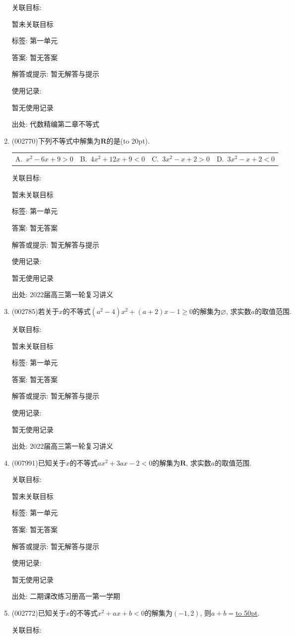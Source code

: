 \documentclass[10pt,a4paper]{article}
\newcommand{\blank}[1]{\underline{\hbox to #1pt{}}}
\newcommand{\bracket}[1]{(\hbox to #1pt{})}
\newcommand{\fourch}[4]{\par\begin{tabular}{p{.23\textwidth}p{.23\textwidth}p{.23\textwidth}p{.23\textwidth}}
A.~#1 &B.~#2& C.~#3& D.~#4
\end{tabular}}
\begin{document}
\begin{enumerate}[1.]
关联目标:

暂未关联目标



标签: 第一单元

答案: 暂无答案

解答或提示: 暂无解答与提示

使用记录:

暂无使用记录


出处: 代数精编第二章不等式
\item { (002770)}下列不等式中解集为$\mathbf{R}$的是\bracket{20}.
\fourch{$x^2-6x+9>0$}{$4x^2+12x+9<0$}{$3x^2-x+2>0$}{$3x^2-x+2<0$}


关联目标:

暂未关联目标



标签: 第一单元

答案: 暂无答案

解答或提示: 暂无解答与提示

使用记录:

暂无使用记录


出处: 2022届高三第一轮复习讲义
\item { (002785)}若关于$x$的不等式$(a^2-4)x^2+(a+2)x-1\ge 0$的解集为$\varnothing$, 求实数$a$的取值范围.


关联目标:

暂未关联目标



标签: 第一单元

答案: 暂无答案

解答或提示: 暂无解答与提示

使用记录:

暂无使用记录


出处: 2022届高三第一轮复习讲义
\item { (007991)}已知关于$x$的不等式$ax^2+3ax-2<0$的解集为$\mathbf{R}$, 求实数$a$的取值范围.


关联目标:

暂未关联目标



标签: 第一单元

答案: 暂无答案

解答或提示: 暂无解答与提示

使用记录:

暂无使用记录


出处: 二期课改练习册高一第一学期
\item { (002772)}已知关于$x$的不等式$x^2+ax+b<0$的解集为$(-1,2)$, 则$a+b=$\blank{50}.


关联目标:


\end{enumerate}
\end{document}
